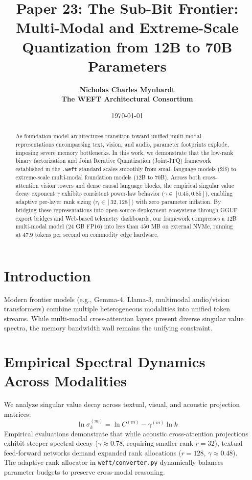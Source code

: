 \documentclass[11pt,a4paper]{article}
\title{\textbf{Paper 23: The Sub-Bit Frontier: Multi-Modal and Extreme-Scale Quantization from 12B to 70B Parameters}}
\author{
  \textbf{Nicholas Charles Mynhardt} \\
  \textbf{The WEFT Architectural Consortium}
}
\date{\today}
\begin{document}
\maketitle

\begin{abstract}
As foundation model architectures transition toward unified multi-modal representations encompassing text, vision, and audio, parameter footprints explode, imposing severe memory bottlenecks. In this work, we demonstrate that the low-rank binary factorization and Joint Iterative Quantization (Joint-ITQ) framework established in the \texttt{.weft} standard scales smoothly from small language models ($2$B) to extreme-scale multi-modal foundation models ($12$B to $70$B). Across both cross-attention vision towers and dense causal language blocks, the empirical singular value decay exponent $\gamma$ exhibits consistent power-law behavior ($\gamma \in [0.45, 0.85]$), enabling adaptive per-layer rank sizing ($r_l \in [32, 128]$) with zero parameter inflation. By bridging these representations into open-source deployment ecosystems through GGUF export bridges and Web-based telemetry dashboards, our framework compresses a 12B multi-modal model ($24$ GB FP16) into less than $450$ MB on external NVMe, running at $47.9$ tokens per second on commodity edge hardware.
\end{abstract}

\section{Introduction}
Modern frontier models (e.g., Gemma-4, Llama-3, multimodal audio/vision transformers) combine multiple heterogeneous modalities into unified token streams. While multi-modal cross-attention layers present diverse singular value spectra, the memory bandwidth wall remains the unifying constraint.

\section{Empirical Spectral Dynamics Across Modalities}
We analyze singular value decay across textual, visual, and acoustic projection matrices:
\begin{equation}
\ln \sigma_k^{(m)} = \ln C^{(m)} - \gamma^{(m)} \ln k
\end{equation}
Empirical evaluations demonstrate that while acoustic cross-attention projections exhibit steeper spectral decay ($\gamma \approx 0.78$, requiring smaller rank $r=32$), textual feed-forward networks demand expanded rank allocations ($r=128$, $\gamma \approx 0.48$). The adaptive rank allocator in \texttt{weft/converter.py} dynamically balances parameter budgets to preserve cross-modal reasoning.
\end{document}
